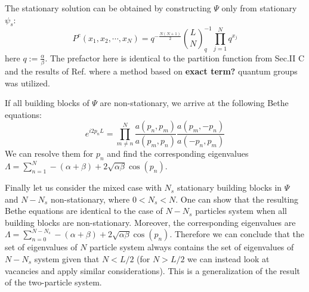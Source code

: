 \documentclass[aps,showpacs,twocolumn,floatfix,prx,superscriptaddress]{revtex4-1}
\begin{document}
The stationary solution can be obtained by constructing $\Psi$ only from stationary $\psi_s$: 
\begin{equation}
    \label{eq:stationarySolutionN}
    P^e(x_1, x_2, \cdots, x_N) = q^{-\frac{N(N+1)}{2}}
    \binom{L}{N}_q^{-1}\prod_{j=1}^N{q^{x_j}}
\end{equation}
here $q:=\frac{\alpha}{\beta}$. The prefactor here is identical to the partition function from Sec.II C and the results of Ref.\cite{} where a method based on {\bf exact term?} quantum groups was utilized.

If all building blocks of $\Psi$ are non-stationary, we arrive at the following Bethe equations:
\begin{equation}
    \label{eq:betheEqN}
    e^{i2p_nL}  =  \prod_{m\neq n}^N\frac{a(p_n, p_m)}{a(p_m, p_n)} 
    \frac{a(p_m, -p_n)}{a(-p_n, p_m)}
\end{equation}
We can resolve them for $p_n$ and find the corresponding eigenvalues $\Lambda=\sum_{n=1}^N -(\alpha+\beta) + 2\sqrt{\alpha\beta}\cos(p_n)$. 

Finally let us consider the mixed case with $N_s$ stationary building blocks in $\Psi$ and $N-N_s$ non-stationary, where $0<N_s<N$. One can show that the resulting Bethe equations are identical to the case of $N-N_s$ particles system when all building blocks are non-stationary. Moreover, the corresponding eigenvalues are $\Lambda = \sum_{n=0}^{N-N_s} -(\alpha+\beta)+2\sqrt{\alpha\beta}\cos(p_n)$. Therefore we can conclude that the set of eigenvalues of $N$ particle system always contains the set of eigenvalues of $N-N_s$ system given that $N<L/2$ (for $N>L/2$ we can instead look at vacancies and apply similar considerations). This is a generalization of the result of the two-particle system.
\end{document}

